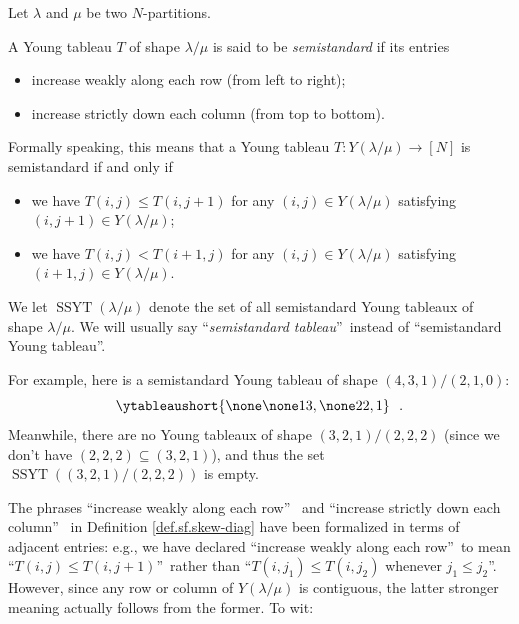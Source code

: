 \begin{definition}
\label{def.sf.skew-ssyt}Let $\lambda$ and $\mu$ be two $N$-partitions.

A Young tableau $T$ of shape $\lambda/\mu$ is said to be \emph{semistandard}
if its entries

\begin{itemize}
\item increase weakly along each row (from left to right);

\item increase strictly down each column (from top to bottom).
\end{itemize}

Formally speaking, this means that a Young tableau $T:Y\left(  \lambda
/\mu\right)  \rightarrow\left[  N\right]  $ is semistandard if and only if

\begin{itemize}
\item we have $T\left(  i,j\right)  \leq T\left(  i,j+1\right)  $ for any
$\left(  i,j\right)  \in Y\left(  \lambda/\mu\right)  $ satisfying $\left(
i,j+1\right)  \in Y\left(  \lambda/\mu\right)  $;

\item we have $T\left(  i,j\right)  <T\left(  i+1,j\right)  $ for any $\left(
i,j\right)  \in Y\left(  \lambda/\mu\right)  $ satisfying $\left(
i+1,j\right)  \in Y\left(  \lambda/\mu\right)  $.
\end{itemize}

We let $\operatorname*{SSYT}\left(  \lambda/\mu\right)  $ denote the set of
all semistandard Young tableaux of shape $\lambda/\mu$. We will usually say
\textquotedblleft\emph{semistandard tableau}\textquotedblright\ instead of
\textquotedblleft semistandard Young tableau\textquotedblright.
\end{definition}

For example, here is a semistandard Young tableau of shape $\left(
4,3,1\right)  /\left(  2,1,0\right)  $:%
\[
\ytableaushort{\none\none 13,\none 22,1}\ \ .
\]
Meanwhile, there are no Young tableaux of shape $\left(  3,2,1\right)
/\left(  2,2,2\right)  $ (since we don't have $\left(  2,2,2\right)
\subseteq\left(  3,2,1\right)  $), and thus the set $\operatorname*{SSYT}%
\left(  \left(  3,2,1\right)  /\left(  2,2,2\right)  \right)  $ is empty.

The phrases \textquotedblleft increase weakly along each row\textquotedblright%
\ and \textquotedblleft increase strictly down each column\textquotedblright%
\ in Definition \ref{def.sf.skew-diag} have been formalized in terms of
adjacent entries: e.g., we have declared \textquotedblleft increase weakly
along each row\textquotedblright\ to mean \textquotedblleft$T\left(
i,j\right)  \leq T\left(  i,j+1\right)  $\textquotedblright\ rather than
\textquotedblleft$T\left(  i,j_{1}\right)  \leq T\left(  i,j_{2}\right)  $
whenever $j_{1}\leq j_{2}$\textquotedblright. However, since any row or column
of $Y\left(  \lambda/\mu\right)  $ is contiguous, the latter stronger meaning
actually follows from the former. To wit:


